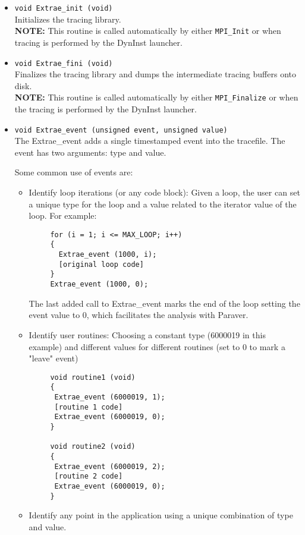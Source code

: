 \begin{itemize}

 \item {\tt void Extrae\_init (void)}\\
 Initializes the tracing library.\\
 {\bf NOTE:} This routine is called automatically by either {\tt MPI\_Init} or when tracing is performed by the DynInst launcher.

 \item {\tt void Extrae\_fini (void)}\\
 Finalizes the tracing library and dumps the intermediate tracing buffers onto disk.\\
 {\bf NOTE:} This routine is called automatically by either {\tt MPI\_Finalize} or when the tracing is performed by the DynInst launcher.

 \item {\tt void Extrae\_event (unsigned event, unsigned value)}\\
 The Extrae\_event adds a single timestamped event into the tracefile. The event has two arguments: type and value.

 Some common use of events are:
  \begin{itemize}
   \item Identify loop iterations (or any code block): Given a loop, the user can set a unique type for the loop and a value related to the iterator value of the loop. For example:
    \begin{verbatim}
     for (i = 1; i <= MAX_LOOP; i++)
     {
       Extrae_event (1000, i);
       [original loop code]
     }
     Extrae_event (1000, 0);
    \end{verbatim}
   The last added call to Extrae\_event marks the end of the loop setting the event value to 0, which facilitates the analysis with Paraver.
   \item Identify user routines: Choosing a constant type (6000019 in this example) and different values for different routines (set to 0 to mark a "leave" event) 
    \begin{verbatim}
     void routine1 (void)
     {
      Extrae_event (6000019, 1);
      [routine 1 code]
      Extrae_event (6000019, 0);
     }

     void routine2 (void)
     {
      Extrae_event (6000019, 2);
      [routine 2 code]
      Extrae_event (6000019, 0);
     }
   \end{verbatim}
   \item Identify any point in the application using a unique combination of type and value.
  \end{itemize}


\end{itemize}
